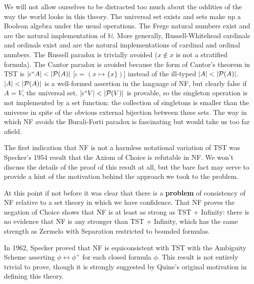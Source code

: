 \documentclass{slides}
\begin{document}
\begin{slide}

We will not allow ourselves to be distracted too much about the oddities of the way the world looks in this theory.  The universal set exists and sets make up a Boolean algebra under the usual operations.  The Frege natural numbers exist and are the natural implementation of $\mathbb N$.  More generally, Russell-Whitehead cardinals and ordinals exist and are the natural implementations of cardinal and ordinal numbers.  The Russell paradox is trivially avoided ($x \not\in x$ is not a stratified formula).  The Cantor paradox is avoided because the form of Cantor's theorem in TST is $|\iota``A| < |{\cal P}(A)|$ [$\iota = (x \mapsto \{x\})$]  instead of the ill-typed $|A| < |{\cal P}(A)|$.  $|A| < |{\cal P}(A)|$ is a well-formed assertion in the language of NF, but clearly false if $A=V$, the universal set.  $|\iota``V| < |{\cal P}(V)|$  is provable, so the singleton operation is not implemented by a set function:  the collection of singletons is smaller than the universe in spite of the obvious external bijection between these sets.  The way in which NF avoids the Burali-Forti paradox is fascinating but would take us too far afield.

\end{slide}

\begin{slide}

The first indication that NF is not a harmless notational variation of TST was Specker's 1954 result that the Axiom of Choice is refutable in NF.  We won't discuss the details of the proof of this result at all, but the bare fact may serve to provide a hint of the motivation behind the approach we took to the problem.

At this point if not before it was clear that there is a {\bf problem} of consistency of NF relative to a set theory in which we have confidence.  That NF proves the negation of Choice shows
that NF is at least as strong as TST + Infinity:  there is no evidence that NF is any stronger than TST + Infinity, which has the same strength as Zermelo with Separation restricted to bounded formulas.

\end{slide}

\begin{slide}

In 1962, Specker proved that NF is equiconsistent with TST with the Ambiguity Scheme asserting $\phi \leftrightarrow \phi^+$ for each closed formula $\phi$.  This result is not entirely trivial to prove, though it is strongly suggested by Quine's original motivation in defining this theory.

\end{slide}
\end{document}
